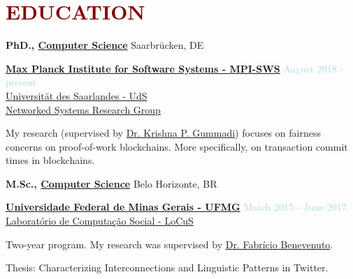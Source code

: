 \section*{\textcolor{maroon}{\normalsize EDUCATION}} 

\textbf{PhD., \href{https://www.mpi-sws.org}{Computer Science}}  \hfill {Saarbrücken, DE}
\begin{outerlist}

\item[] \href{https://www.mpi-sws.org}{\textbf{Max Planck Institute for Software Systems - MPI-SWS}} \hfill {\textcolor{lightblue}{August 2018 - present}}
\\ \href{https://www.uni-saarland.de/nc/en/home.html}{Universität des Saarlandes - UdS}
\\ \href{https://www.mpi-sws.org/research-areas/social-and-information-systems/}{Networked Systems Research Group}  \medskip

        \begin{innerlist}[-]
                \item My research (supervised by \href{https://people.mpi-sws.org/~gummadi/}{Dr. Krishna P. Gummadi}) focuses on fairness concerns on proof-of-work blockchains. More specifically, on transaction commit times in blockchains.
        \end{innerlist}

\end{outerlist}

\medskip


\textbf{M.Sc., 
        \href{https://ufmg.br/}
             {Computer Science}} \hfill {Belo Horizonte, BR}
\begin{outerlist}

\item[] \href{https://ufmg.br/}{\textbf{Universidade Federal de Minas Gerais - UFMG}}  \hfill {\textcolor{lightblue}{March 2015 - June 2017}}
\\ \href{https://www.dcc.ufmg.br/dcc/?q=pt-br/node/2728}{Laboratório de Computação Social - LoCuS}  \medskip 

        \begin{innerlist}[-]
        \item Two-year program. My research was supervised by \href{https://homepages.dcc.ufmg.br/~fabricio/}{Dr. Fabrício Benevenuto}.
        \item Thesis: Characterizing Interconnections and Linguistic Patterns in Twitter.        
        \end{innerlist}

\end{outerlist}

